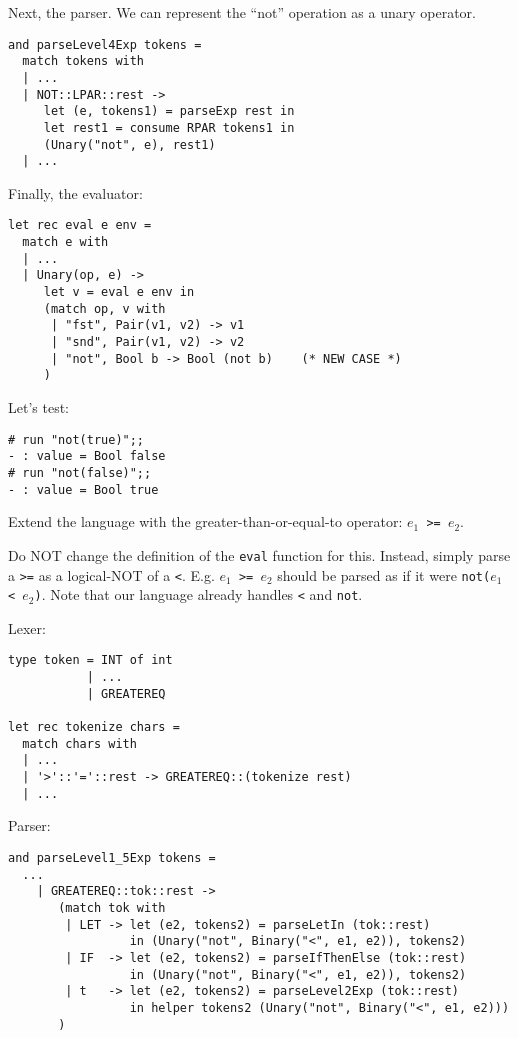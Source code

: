 \documentclass[addpoints]{exam}
\begin{document}
\begin{questions}
\begin{solution}
    Next, the parser. We can represent the ``not'' operation
    as a unary operator.

    \begin{verbatim}
and parseLevel4Exp tokens =
  match tokens with
  | ...
  | NOT::LPAR::rest ->
     let (e, tokens1) = parseExp rest in
     let rest1 = consume RPAR tokens1 in
     (Unary("not", e), rest1)
  | ...
    \end{verbatim}

    Finally, the evaluator:

    \begin{verbatim}
let rec eval e env =
  match e with
  | ...
  | Unary(op, e) ->
     let v = eval e env in
     (match op, v with
      | "fst", Pair(v1, v2) -> v1
      | "snd", Pair(v1, v2) -> v2
      | "not", Bool b -> Bool (not b)    (* NEW CASE *)
     )
    \end{verbatim}
    
    Let's test:
    \begin{verbatim}
# run "not(true)";;
- : value = Bool false
# run "not(false)";;
- : value = Bool true
    \end{verbatim}
  \end{solution}

  
  \question
  Extend the language with
  the greater-than-or-equal-to operator: \texttt{$e_1$ >= $e_2$}.

  Do NOT change the definition of the \texttt{eval} function for this.
  Instead, simply parse a \texttt{>=}
  as a logical-NOT of a \texttt{<}.
  E.g. \texttt{$e_1$ >= $e_2$} should be parsed
  as if it were \texttt{not($e_1$ < $e_2$)}.
  Note that our language already handles \texttt{<} and \texttt{not}.

  \begin{solution}
    Lexer:
    \begin{verbatim}
type token = INT of int
           | ...
           | GREATEREQ      

let rec tokenize chars =
  match chars with
  | ...
  | '>'::'='::rest -> GREATEREQ::(tokenize rest)
  | ...
    \end{verbatim}    

    Parser:
    \begin{verbatim}
and parseLevel1_5Exp tokens =
  ...
    | GREATEREQ::tok::rest ->
       (match tok with
        | LET -> let (e2, tokens2) = parseLetIn (tok::rest)
                 in (Unary("not", Binary("<", e1, e2)), tokens2)
        | IF  -> let (e2, tokens2) = parseIfThenElse (tok::rest)
                 in (Unary("not", Binary("<", e1, e2)), tokens2)
        | t   -> let (e2, tokens2) = parseLevel2Exp (tok::rest)
                 in helper tokens2 (Unary("not", Binary("<", e1, e2)))
       )      
    \end{verbatim}    


\end{solution}
\end{questions}
\end{document}
